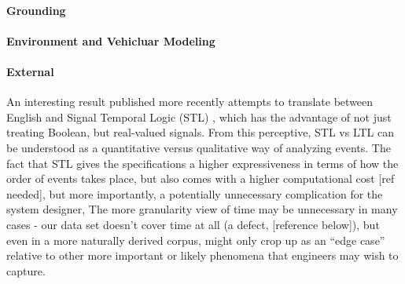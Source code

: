 \documentclass[a4paper, 11pt]{article}
\begin{document}
\paragraph{Grounding}



\paragraph{Environment and Vehicluar Modeling}
\paragraph{External }




An interesting result published more recently attempts to translate between
English and Signal Temporal Logic (STL) \cite{he2021english}, which has the
advantage of not just treating Boolean, but real-valued signals. From this
perceptive, STL vs LTL can be understood as a quantitative versus qualitative
way of analyzing events. The fact that STL gives the specifications a higher
expressiveness in terms of how the order of events takes place, but also comes
with a higher computational cost [ref needed], but more importantly, a
potentially unnecessary complication for the system designer, The more
granularity view of time may be unnecessary in many cases - our data set doesn't
cover time at all (a defect, [reference below]), but even in a more naturally
derived corpus, might only crop up as an ``edge case'' relative to other more
important or likely phenomena that engineers may wish to capture.
\end{document}
